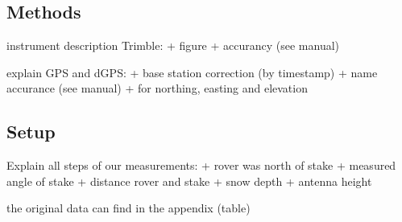 
\subsection{Methods}

instrument description Trimble:
+ figure
+ accurancy (see manual)

explain GPS and dGPS:
+ base station correction (by timestamp)
+ name accurance (see manual)
+ for northing, easting and elevation


\subsection{Setup}

Explain all steps of our measurements:
+ rover was north of stake
+ measured angle of stake
+ distance rover and stake
+ snow depth 
+ antenna height

the original data can find in the appendix (table)